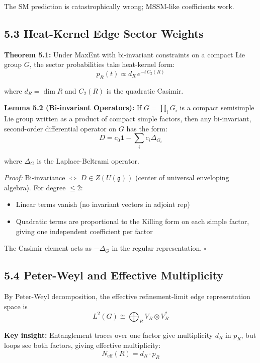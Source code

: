 The SM prediction is catastrophically wrong; MSSM-like coefficients work.

\subsection{5.3 Heat-Kernel Edge Sector Weights}\label{53-heat-kernel-edge-sector-weights}

\textbf{Theorem 5.1:} Under MaxEnt with bi-invariant constraints on a compact Lie group \(G\), the sector probabilities take heat-kernel form: \[p_R(t) \propto d_R \, e^{-t \, C_2(R)}\]

where \(d_R = \dim R\) and \(C_2(R)\) is the quadratic Casimir.

\textbf{Lemma 5.2 (Bi-invariant Operators):} If \(G=\prod_i G_i\) is a compact semisimple Lie group written as a product of compact simple factors, then any bi-invariant, second-order differential operator on \(G\) has the form: \[D = c_0 \mathbf{1} - \sum_i c_i \Delta_{G_i}\]

where \(\Delta_G\) is the Laplace-Beltrami operator.

\emph{Proof:} Bi-invariance \(\Leftrightarrow\) \(D \in Z(U(\mathfrak{g}))\) (center of universal enveloping algebra). For degree \(\leq 2\):

\begin{itemize}
\tightlist
\item
  Linear terms vanish (no invariant vectors in adjoint rep)
\item
  Quadratic terms are proportional to the Killing form on each simple factor, giving one independent coefficient per factor
\end{itemize}

The Casimir element acts as \(-\Delta_G\) in the regular representation. \(\square\)

\subsection{5.4 Peter-Weyl and Effective Multiplicity}\label{54-peter-weyl-and-effective-multiplicity}

By Peter-Weyl decomposition, the effective refinement-limit edge representation space is
\[L^2(G) \cong \bigoplus_R V_R \otimes V_R^*\]

\textbf{Key insight:} Entanglement traces over one factor give multiplicity \(d_R\) in \(p_R\), but loops see both factors, giving effective multiplicity: \[N_{\text{eff}}(R) = d_R \cdot p_R\]

